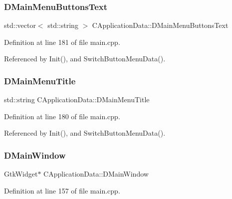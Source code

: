 \subsubsection{\texorpdfstring{D\+Main\+Menu\+Buttons\+Text}{DMainMenuButtonsText}}
{\footnotesize\ttfamily std\+::vector$<$ std\+::string $>$ C\+Application\+Data\+::\+D\+Main\+Menu\+Buttons\+Text\hspace{0.3cm}{\ttfamily [protected]}}



Definition at line 181 of file main.\+cpp.



Referenced by Init(), and Switch\+Button\+Menu\+Data().

\hypertarget{classCApplicationData_a2b0ca036562d2af6eca3ee4a6e2330f8}{}\label{classCApplicationData_a2b0ca036562d2af6eca3ee4a6e2330f8} 
\subsubsection{\texorpdfstring{D\+Main\+Menu\+Title}{DMainMenuTitle}}
{\footnotesize\ttfamily std\+::string C\+Application\+Data\+::\+D\+Main\+Menu\+Title\hspace{0.3cm}{\ttfamily [protected]}}



Definition at line 180 of file main.\+cpp.



Referenced by Init(), and Switch\+Button\+Menu\+Data().

\hypertarget{classCApplicationData_af3c57a84b4ecca8a7f86b67a0ae55372}{}\label{classCApplicationData_af3c57a84b4ecca8a7f86b67a0ae55372} 
\subsubsection{\texorpdfstring{D\+Main\+Window}{DMainWindow}}
{\footnotesize\ttfamily Gtk\+Widget$\ast$ C\+Application\+Data\+::\+D\+Main\+Window\hspace{0.3cm}{\ttfamily [protected]}}



Definition at line 157 of file main.\+cpp.



